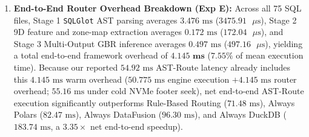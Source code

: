 \documentclass[10pt,a4paper]{article}
\begin{document}
\begin{enumerate}[leftmargin=1.5em,itemsep=2pt]
    \item \textbf{End-to-End Router Overhead Breakdown (Exp E):} Across all 75 SQL files, Stage 1 \texttt{SQLGlot} AST parsing averages $3.476\text{ ms}$ ($3475.91\text{ }\mu\text{s}$), Stage 2 9D feature and zone-map extraction averages $0.172\text{ ms}$ ($172.04\text{ }\mu\text{s}$), and Stage 3 Multi-Output GBR inference averages $0.497\text{ ms}$ ($497.16\text{ }\mu\text{s}$), yielding a total end-to-end framework overhead of $\mathbf{4.145\text{ ms}}$ ($7.55\%$ of mean execution time). Because our reported $54.92\text{ ms}$ AST-Route latency already includes this $4.145\text{ ms}$ warm overhead ($50.775\text{ ms}$ engine execution $+ 4.145\text{ ms}$ router overhead; $55.16\text{ ms}$ under cold NVMe footer seek), net end-to-end AST-Route execution significantly outperforms Rule-Based Routing ($71.48\text{ ms}$), Always Polars ($82.47\text{ ms}$), Always DataFusion ($96.30\text{ ms}$), and Always DuckDB ($183.74\text{ ms}$, a $3.35\times$ net end-to-end speedup).
\end{enumerate}
\end{document}
